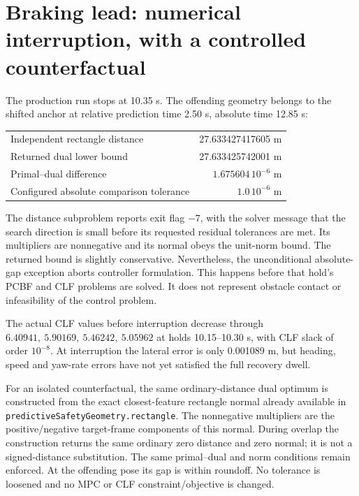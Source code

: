 \documentclass[11pt]{article}
\begin{document}
\section{Braking lead: numerical interruption, with a controlled counterfactual}
The production run stops at 10.35 s. The offending geometry belongs to the
shifted anchor at relative prediction time 2.50 s, absolute time 12.85 s:
\begin{center}\small
\begin{tabular}{lr}
\toprule
Independent rectangle distance & 27.633427417605 m\\
Returned dual lower bound & 27.633425742001 m\\
Primal--dual difference & $1.675604\,10^{-6}$ m\\
Configured absolute comparison tolerance & $1.0\,10^{-6}$ m\\
\bottomrule
\end{tabular}
\end{center}
The distance subproblem reports exit flag $-7$, with the solver message
that the search direction is small before its requested residual tolerances
are met. Its multipliers are nonnegative and its normal obeys the unit-norm
bound. The returned bound is slightly conservative. Nevertheless, the
unconditional absolute-gap exception aborts controller formulation. This
happens before that hold's PCBF and CLF problems are solved. It does not
represent obstacle contact or infeasibility of the control problem.

The actual CLF values before interruption decrease through
$6.40941,\ 5.90169,\ 5.46242,\ 5.05962$ at holds 10.15--10.30 s, with CLF
slack of order $10^{-8}$. At interruption the lateral error is only
0.001089 m, but heading, speed and yaw-rate errors have not yet satisfied
the full recovery dwell.

For an isolated counterfactual, the same ordinary-distance dual optimum is
constructed from the exact closest-feature rectangle normal already
available in \texttt{predictiveSafetyGeometry.rectangle}. The nonnegative
multipliers are the positive/negative target-frame components of this
normal. During overlap the construction returns the same ordinary zero
distance and zero normal; it is not a signed-distance substitution. The
same primal--dual and norm conditions remain enforced. At the offending
pose its gap is within roundoff. No tolerance is loosened and no MPC or CLF
constraint/objective is changed.
\end{document}
